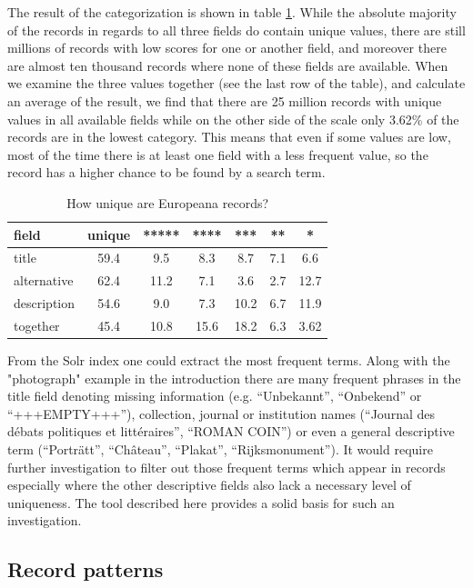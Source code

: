 The result of the categorization is shown in table \ref{table:uniqueness-result}. While the absolute majority of the records in regards to all three fields do contain unique values, there are still millions of records with low scores for one or another field, and moreover there are almost ten thousand records where none of these fields are available. When we examine the three values together (see the last row of the table), and calculate an average of the result, we find that there are 25 million records with unique values in all available fields while on the other side of the scale only 3.62\% of the records are in the lowest category. This means that even if some values are low, most of the time there is at least one field with a less frequent value, so the record has a higher chance to be found by a search term.

\begin{table}
\caption{How unique are Europeana records?}
\label{table:uniqueness-result}
\centering
\begin{tabular}{l|c|c|c|c|c|c}
field & unique & ***** & **** & *** & ** & * \\
\hline
title & 59.4 & 9.5 & 8.3 & 8.7 & 7.1 & 6.6 \\
alternative & 62.4 & 11.2 & 7.1 & 3.6 & 2.7 & 12.7 \\
description & 54.6 & 9.0 & 7.3 & 10.2 & 6.7 & 11.9 \\
together & 45.4 & 10.8 & 15.6 & 18.2 & 6.3 & 3.62
\end{tabular}
\end{table}

From the Solr index one could extract the most frequent terms. Along with the "photograph" example in the introduction there are many frequent phrases in the title field denoting missing information (e.g. ``Unbekannt'', ``Onbekend'' or ``+++EMPTY+++''), collection, journal or institution names (``Journal des débats politiques et littéraires'', ``ROMAN COIN'') or even a general descriptive term (``Porträtt'', ``Château'', ``Plakat'', ``Rijksmonument''). It would require further investigation to filter out those frequent terms which appear in records especially where the other descriptive fields also lack a necessary level of uniqueness. The tool described here provides a solid basis for such an investigation.

\subsection{Record patterns}


